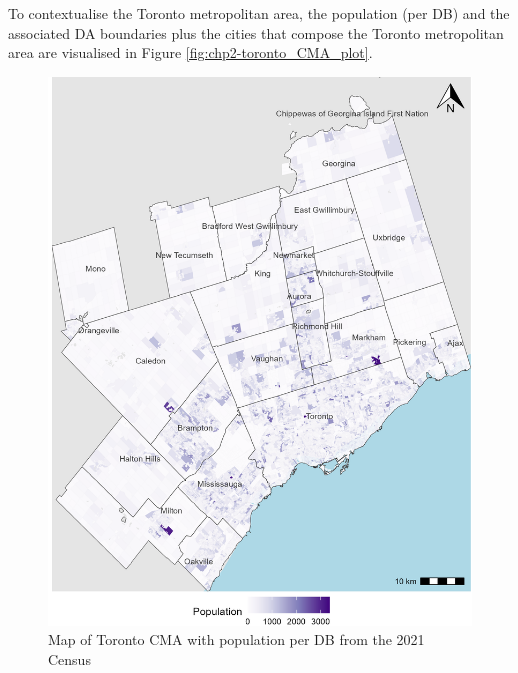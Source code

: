 \documentclass[
11pt, %
oneside, %
english, %
singlespacing, %
]{macthesis} %
\begin{document}
To contextualise the Toronto metropolitan area, the population (per DB) and the associated DA boundaries plus the cities that compose the Toronto metropolitan area are visualised in Figure \ref{fig:chp2-toronto_CMA_plot}.

\begin{figure}

{\centering \includegraphics[width=6in]{./data/figures/chp2-toronto_CMA_plot} 

}

\caption{\label{fig:chp2-toronto_CMA_plot}Map of Toronto CMA with population per DB from the 2021 Census}\label{fig:unnamed-chunk-5}
\end{figure}
\end{document}
